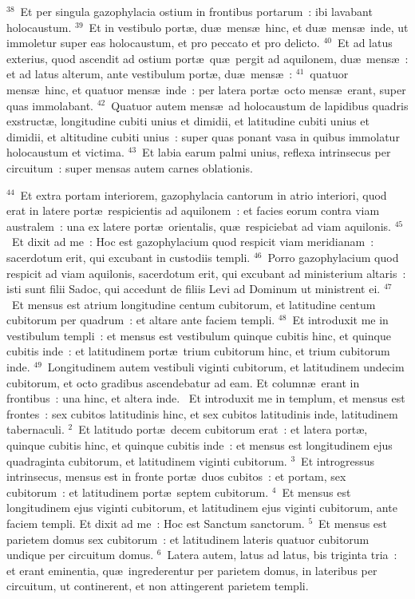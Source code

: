 ${}^{38}$~Et per singula gazophylacia ostium in frontibus portarum~: ibi lavabant holocaustum.
${}^{39}$~Et in vestibulo port\ae , du\ae\ mens\ae\ hinc, et du\ae\ mens\ae\ inde, ut immoletur super eas holocaustum, et pro peccato et pro delicto.
${}^{40}$~Et ad latus exterius, quod ascendit ad ostium port\ae\ qu\ae\ pergit ad aquilonem, du\ae\ mens\ae~: et ad latus alterum, ante vestibulum port\ae , du\ae\ mens\ae~:
${}^{41}$~quatuor mens\ae\ hinc, et quatuor mens\ae\ inde~: per latera port\ae\ octo mens\ae\ erant, super quas immolabant.
${}^{42}$~Quatuor autem mens\ae\ ad holocaustum de lapidibus quadris exstruct\ae , longitudine cubiti unius et dimidii, et latitudine cubiti unius et dimidii, et altitudine cubiti unius~: super quas ponant vasa in quibus immolatur holocaustum et victima.
${}^{43}$~Et labia earum palmi unius, reflexa intrinsecus per circuitum~: super mensas autem carnes oblationis.


${}^{44}$~Et extra portam interiorem, gazophylacia cantorum in atrio interiori, quod erat in latere port\ae\ respicientis ad aquilonem~: et facies eorum contra viam australem~: una ex latere port\ae\ orientalis, qu\ae\ respiciebat ad viam aquilonis.
${}^{45}$~Et dixit ad me~: Hoc est gazophylacium quod respicit viam meridianam~: sacerdotum erit, qui excubant in custodiis templi.
${}^{46}$~Porro gazophylacium quod respicit ad viam aquilonis, sacerdotum erit, qui excubant ad ministerium altaris~: isti sunt filii Sadoc, qui accedunt de filiis Levi ad Dominum ut ministrent ei.
${}^{47}$~Et mensus est atrium longitudine centum cubitorum, et latitudine centum cubitorum per quadrum~: et altare ante faciem templi.
${}^{48}$~Et introduxit me in vestibulum templi~: et mensus est vestibulum quinque cubitis hinc, et quinque cubitis inde~: et latitudinem port\ae\ trium cubitorum hinc, et trium cubitorum inde.
${}^{49}$~Longitudinem autem vestibuli viginti cubitorum, et latitudinem undecim cubitorum, et octo gradibus ascendebatur ad eam. Et column\ae\ erant in frontibus~: una hinc, et altera inde.
~Et introduxit me in templum, et mensus est frontes~: sex cubitos latitudinis hinc, et sex cubitos latitudinis inde, latitudinem tabernaculi.
${}^{2}$~Et latitudo port\ae\ decem cubitorum erat~: et latera port\ae , quinque cubitis hinc, et quinque cubitis inde~: et mensus est longitudinem ejus quadraginta cubitorum, et latitudinem viginti cubitorum.
${}^{3}$~Et introgressus intrinsecus, mensus est in fronte port\ae\ duos cubitos~: et portam, sex cubitorum~: et latitudinem port\ae\ septem cubitorum.
${}^{4}$~Et mensus est longitudinem ejus viginti cubitorum, et latitudinem ejus viginti cubitorum, ante faciem templi. Et dixit ad me~: Hoc est Sanctum sanctorum.
${}^{5}$~Et mensus est parietem domus sex cubitorum~: et latitudinem lateris quatuor cubitorum undique per circuitum domus.
${}^{6}$~Latera autem, latus ad latus, bis triginta tria~: et erant eminentia, qu\ae\ ingrederentur per parietem domus, in lateribus per circuitum, ut continerent, et non attingerent parietem templi.


